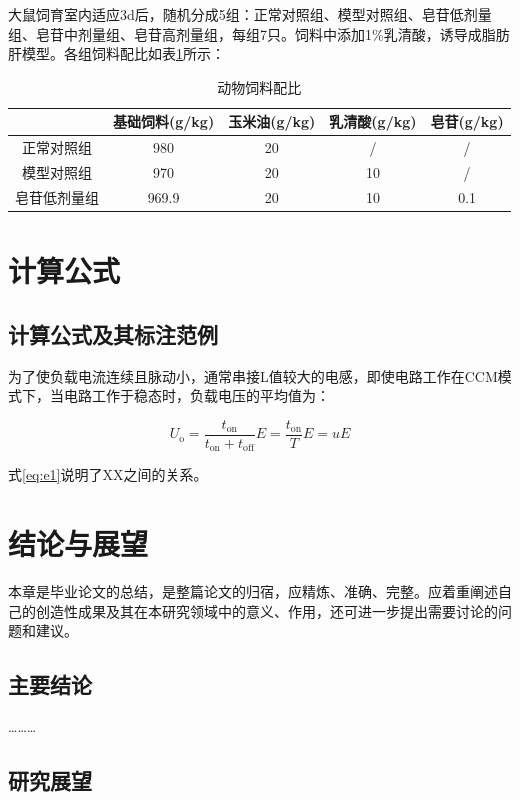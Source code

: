 \documentclass{QITthesis}
\begin{document}
大鼠饲育室内适应3d后，随机分成5组：正常对照组、模型对照组、皂苷低剂量组、皂苷中剂量组、皂苷高剂量组，每组7只。饲料中添加1\%乳清酸，诱导成脂肪肝模型。各组饲料配比如表\ref{tab:t1}所示：

\begin{table}[H]
    \centering
    \caption{动物饲料配比}
    \label{tab:t1}
    \begin{tabular}{ccccc}
    \toprule
    & 基础饲料(g/kg) & 玉米油(g/kg) & 乳清酸(g/kg) & 皂苷(g/kg) \\
    \midrule
    正常对照组 & 980 & 20 & / & / \\
    模型对照组 & 970 & 20 & 10 & / \\
    皂苷低剂量组 & 969.9 & 20 & 10 & 0.1 \\
    \bottomrule
    \end{tabular}
\end{table}

\section{计算公式}
\subsection{计算公式及其标注范例}

为了使负载电流连续且脉动小，通常串接L值较大的电感，即使电路工作在CCM模式下，当电路工作于稳态时，负载电压的平均值为：

\begin{equation}
    U_{\mathrm{o}}=\frac{t_{\mathrm{on}}}{t_{\mathrm{on}}+t_{\mathrm{off}}} E=\frac{t_{\mathrm{on}}}{T} E=u E
    \label{eq:e1}
\end{equation}

式\eqref{eq:e1}说明了XX之间的关系。

\section{结论与展望}

本章是毕业论文的总结，是整篇论文的归宿，应精炼、准确、完整。应着重阐述自己的创造性成果及其在本研究领域中的意义、作用，还可进一步提出需要讨论的问题和建议。

\subsection{主要结论}

\dots\dots\dots

\subsection{研究展望}
\end{document}
